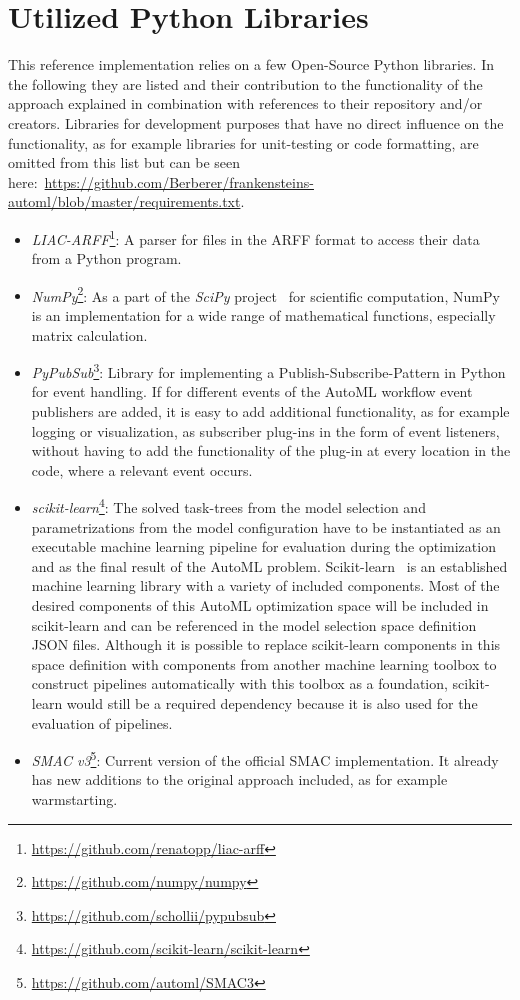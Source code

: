 \section{Utilized Python Libraries}
\label{sec:implementation:libraries}
This reference implementation relies on a few Open-Source Python libraries.
In the following they are listed and their contribution to the functionality of the approach explained in combination with references to their repository and/or creators.
Libraries for development purposes that have no direct influence on the functionality, as for example libraries for unit-testing or code formatting, are omitted from this list but can be seen here:~\url{https://github.com/Berberer/frankensteins-automl/blob/master/requirements.txt}. 
\begin{itemize}
    \item \textit{LIAC-ARFF}\footnote{\url{https://github.com/renatopp/liac-arff}}: A parser for files in the ARFF format to access their data from a Python program.
    \item \textit{NumPy}\footnote{\url{https://github.com/numpy/numpy}}: As a part of the \textit{SciPy} project~\cite{Virtanen-SciPy} for scientific computation, NumPy is an implementation for a wide range of mathematical functions, especially matrix calculation.
    \item \textit{PyPubSub}\footnote{\url{https://github.com/schollii/pypubsub}}: Library for implementing a Publish-Subscribe-Pattern in Python for event handling.
    If for different events of the AutoML workflow event publishers are added, it is easy to add additional functionality, as for example logging or visualization, as subscriber plug-ins in the form of event listeners, without having to add the functionality of the plug-in at every location in the code, where a relevant event occurs.
    \item \textit{scikit-learn}\footnote{\url{https://github.com/scikit-learn/scikit-learn}}: The solved task-trees from the model selection and parametrizations from the model configuration have to be instantiated as an executable machine learning pipeline for evaluation during the optimization and as the final result of the AutoML problem.
    Scikit-learn~\cite{Pedregosa-Scikit-learn} is an established machine learning library with a variety of included components.
    Most of the desired components of this AutoML optimization space will be included in scikit-learn and can be referenced in the model selection space definition JSON files.
    Although it is possible to replace scikit-learn components in this space definition with components from another machine learning toolbox to construct pipelines automatically with this toolbox as a foundation, scikit-learn would still be a required dependency because it is also used for the evaluation of pipelines.
    \item \textit{SMAC v3}\footnote{\url{https://github.com/automl/SMAC3}}: Current version of the official SMAC implementation. It already has new additions to the original approach included, as for example warmstarting.
\end{itemize}

